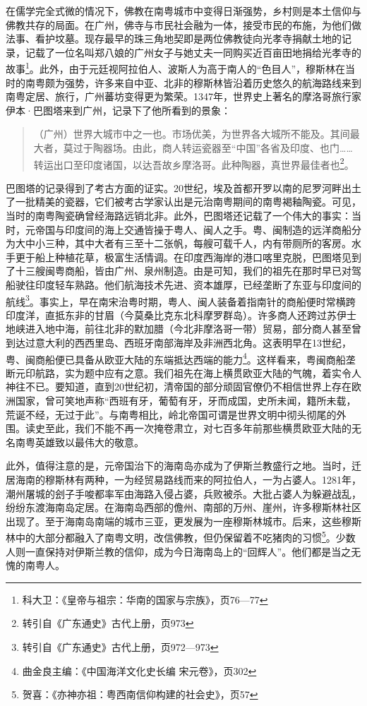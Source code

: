 在儒学完全式微的情况下，佛教在南粤城市中变得日渐强势，乡村则是本土信仰与佛教共存的局面。在广州，佛寺与市民社会融为一体，接受市民的布施，为他们做法事、看护坟墓。现存最早的珠三角地契即是两位佛教徒向光孝寺捐献土地的记录，记载了一位名叫郑八娘的广州女子与她丈夫一同购买近百亩田地捐给光孝寺的故事\footnote{科大卫：《皇帝与祖宗：华南的国家与宗族》，页76—77}。此外，由于元廷视阿拉伯人、波斯人为高于南人的“色目人”，穆斯林在当时的南粤颇为强势，许多来自中亚、北非的穆斯林皆沿着历史悠久的航海路线来到南粤定居、旅行，广州蕃坊变得更为繁荣。1347年，世界史上著名的摩洛哥旅行家伊本·巴图塔来到广州，记录下了他所看到的景象：

\begin{quote}
（广州）世界大城市中之一也。市场优美，为世界各大城所不能及。其间最大者，莫过于陶器场。由此，商人转运瓷器至“中国”各省及印度、也门……转运出口至印度诸国，以达吾故乡摩洛哥。此种陶器，真世界最佳者也\footnote{转引自《广东通史》古代上册，页973}。
\end{quote}

巴图塔的记录得到了考古方面的证实。20世纪，埃及首都开罗以南的尼罗河畔出土了一批精美的瓷器，它们被考古学家认出是元治南粤期间的南粤褐釉陶瓷。可见，当时的南粤陶瓷确曾经海路远销北非。此外，巴图塔还记载了一个伟大的事实：当时，元帝国与印度间的海上交通皆操于粤人、闽人之手。粤、闽制造的远洋商船分为大中小三种，其中大者有三至十二张帆，每艘可载千人，内有带厕所的客房。水手更于船上种植花草，极富生活情调。在印度西海岸的港口喀里克脱，巴图塔见到了十三艘闽粤商船，皆由广州、泉州制造。由是可知，我们的祖先在那时早已对驾船驶往印度轻车熟路。他们航海技术先进、资本雄厚，已经垄断了东亚与印度间的航线\footnote{转引自《广东通史》古代上册，页972—973}。事实上，早在南宋治粤时期，粤人、闽人装备着指南针的商船便时常横跨印度洋，直抵东非的甘眉（今莫桑比克东北科摩罗群岛）。许多商人还跨过苏伊士地峡进入地中海，前往北非的默加腊（今北非摩洛哥一带）贸易，部分商人甚至曾到达过意大利的西西里岛、西班牙南部海岸及非洲西北角。这表明早在13世纪，粤、闽商船便已具备从欧亚大陆的东端抵达西端的能力\footnote{曲金良主编：《中国海洋文化史长编 宋元卷》，页302}。这样看来，粤闽商船垄断元印航路，实为题中应有之意。我们祖先在海上横贯欧亚大陆的气魄，着实令人神往不已。要知道，直到20世纪初，清帝国的部分顽固官僚仍不相信世界上存在欧洲国家，曾可笑地声称“西班有牙，葡萄有牙，牙而成国，史所未闻，籍所未载，荒诞不经，无过于此”。与南粤相比，岭北帝国可谓是世界文明中彻头彻尾的外围。读史至此，我们不能不再一次掩卷肃立，对七百多年前那些横贯欧亚大陆的无名南粤英雄致以最伟大的敬意。 

此外，值得注意的是，元帝国治下的海南岛亦成为了伊斯兰教盛行之地。当时，迁居海南的穆斯林有两种，一为经贸易路线而来的阿拉伯人，一为占婆人。1281年，潮州屠城的刽子手唆都率军由海路入侵占婆，兵败被杀。大批占婆人为躲避战乱，纷纷东渡海南岛定居。在海南岛西部的儋州、南部的万州、崖州，许多穆斯林社区出现了。至于海南岛南端的城市三亚，更发展为一座穆斯林城市。后来，这些穆斯林中的大部分都融入了南粤文明，改信佛教，但仍保留着不吃猪肉的习惯\footnote{贺喜：《亦神亦祖：粤西南信仰构建的社会史》，页57}。少数人则一直保持对伊斯兰教的信仰，成为今日海南岛上的“回辉人”。他们都是当之无愧的南粤人。

